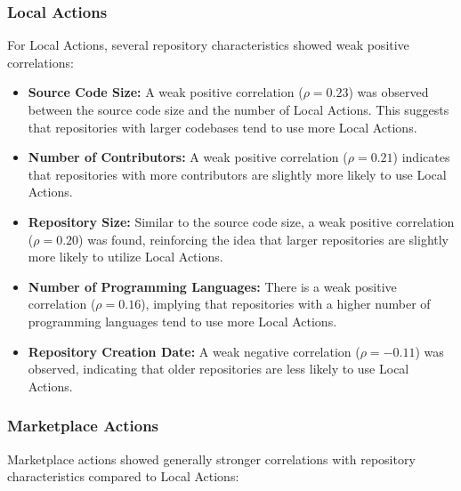 \documentclass[conference]{IEEEtran}
\begin{document}
      \subsubsection{Local Actions}
      For Local Actions, several repository characteristics showed weak positive correlations:
      
      \begin{itemize}
          \item \textbf{Source Code Size:} A weak positive correlation (\(\rho = 0.23\)) was observed between the source code size and the number of Local Actions. This suggests that repositories with larger codebases tend to use more Local Actions.
          \item \textbf{Number of Contributors:} A weak positive correlation (\(\rho = 0.21\)) indicates that repositories with more contributors are slightly more likely to use Local Actions.
          \item \textbf{Repository Size:} Similar to the source code size, a weak positive correlation (\(\rho = 0.20\)) was found, reinforcing the idea that larger repositories are slightly more likely to utilize Local Actions.
          \item \textbf{Number of Programming Languages:} There is a weak positive correlation (\(\rho = 0.16\)), implying that repositories with a higher number of programming languages tend to use more Local Actions.
          \item \textbf{Repository Creation Date:} A weak negative correlation (\(\rho = -0.11\)) was observed, indicating that older repositories are less likely to use Local Actions.\\
      \end{itemize}
      
      \subsubsection{Marketplace Actions}
      Marketplace actions showed generally stronger correlations with repository characteristics compared to Local Actions:
      
\end{document}
